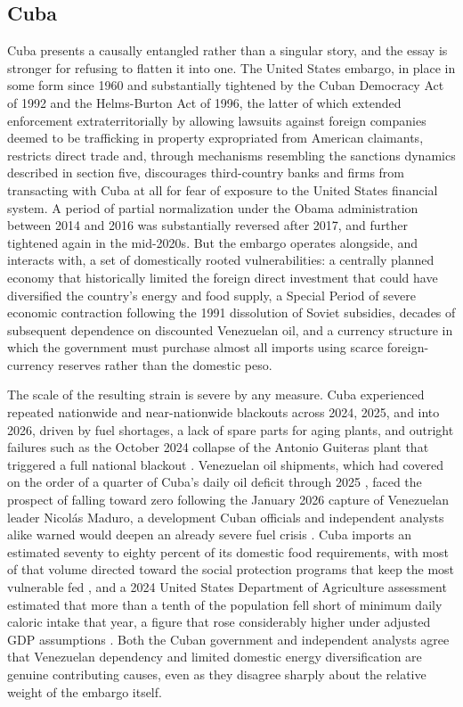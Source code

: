 \documentclass[11pt]{article}
\begin{document}
\subsection{Cuba}

Cuba presents a causally entangled rather than a singular story, and the essay is stronger for refusing to flatten it into one. The United States embargo, in place in some form since 1960 and substantially tightened by the Cuban Democracy Act of 1992 and the Helms-Burton Act of 1996, the latter of which extended enforcement extraterritorially by allowing lawsuits against foreign companies deemed to be trafficking in property expropriated from American claimants, restricts direct trade and, through mechanisms resembling the sanctions dynamics described in section five, discourages third-country banks and firms from transacting with Cuba at all for fear of exposure to the United States financial system. A period of partial normalization under the Obama administration between 2014 and 2016 was substantially reversed after 2017, and further tightened again in the mid-2020s. But the embargo operates alongside, and interacts with, a set of domestically rooted vulnerabilities: a centrally planned economy that historically limited the foreign direct investment that could have diversified the country's energy and food supply, a Special Period of severe economic contraction following the 1991 dissolution of Soviet subsidies, decades of subsequent dependence on discounted Venezuelan oil, and a currency structure in which the government must purchase almost all imports using scarce foreign-currency reserves rather than the domestic peso.

The scale of the resulting strain is severe by any measure. Cuba experienced repeated nationwide and near-nationwide blackouts across 2024, 2025, and into 2026, driven by fuel shortages, a lack of spare parts for aging plants, and outright failures such as the October 2024 collapse of the Antonio Guiteras plant that triggered a full national blackout \cite{cnn2024, ieee2025}. Venezuelan oil shipments, which had covered on the order of a quarter of Cuba's daily oil deficit through 2025 \cite{reuters2026tanker}, faced the prospect of falling toward zero following the January 2026 capture of Venezuelan leader Nicolás Maduro, a development Cuban officials and independent analysts alike warned would deepen an already severe fuel crisis \cite{nbcnews2026}. Cuba imports an estimated seventy to eighty percent of its domestic food requirements, with most of that volume directed toward the social protection programs that keep the most vulnerable fed \cite{wfp2026}, and a 2024 United States Department of Agriculture assessment estimated that more than a tenth of the population fell short of minimum daily caloric intake that year, a figure that rose considerably higher under adjusted GDP assumptions \cite{usda2024}. Both the Cuban government and independent analysts agree that Venezuelan dependency and limited domestic energy diversification are genuine contributing causes, even as they disagree sharply about the relative weight of the embargo itself.
\end{document}

